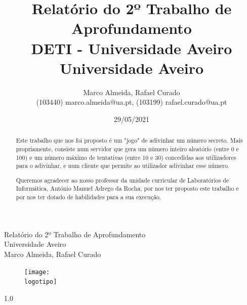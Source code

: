 \documentclass{report}
\begin{document}
%
\def\titulo{Relatório do 2º Trabalho de Aprofundamento}
\def\data{29/05/2021}
\def\autores{Marco Almeida, Rafael Curado}
\def\autorescontactos{(103440) marco.almeida@ua.pt, (103199) rafael.curado@ua.pt}
\def\versao{1.0}
\def\departamento{DETI - Universidade Aveiro}
\def\empresa{Universidade Aveiro}
\def\logotipo{ua.pdf}
%
%
\renewcommand{\contentsname}{Índice}
\begin{titlepage}

\begin{center}
%
\vspace*{50mm}
%
{\Huge \titulo}\\ 
%
\vspace{10mm}
%
{\Large \empresa}\\
%
\vspace{10mm}
%
{\LARGE \autores}\\ 
%
\vspace{30mm}
%
\begin{figure}[h]
\center
\texttt{[image: \\logotipo]}
\end{figure}
%
\vspace{30mm}
\end{center}
%
\begin{flushright}
\versao
\end{flushright}
\end{titlepage}

\title{%
{\Huge\textbf{\titulo}}\\
{\Large \departamento\\ \empresa}
}
%
\author{%
    \autores \\
    \autorescontactos
}
%
\date{\data}
%
\maketitle


\begin{abstract}
Este trabalho que nos foi proposto é um "jogo" de adivinhar um número secreto.
Mais propriamente, consiste num servidor que gera um número inteiro aleatório (entre 0 e 100) e um número máximo de tentativas (entre 10 e 30) concedidas aos utilizadores para o adivinhar, e num cliente que permite ao utilizador adivinhar esse número. 
\end{abstract}

\renewcommand{\abstractname}{Agradecimentos}
\begin{abstract}
Queremos agradecer ao nosso professor da unidade curricular de Laboratórios de Informática, António Manuel Adrego da Rocha, por nos ter proposto este trabalho e por nos ter dotado de habilidades para a sua execução.
\end{abstract}
\end{document}
